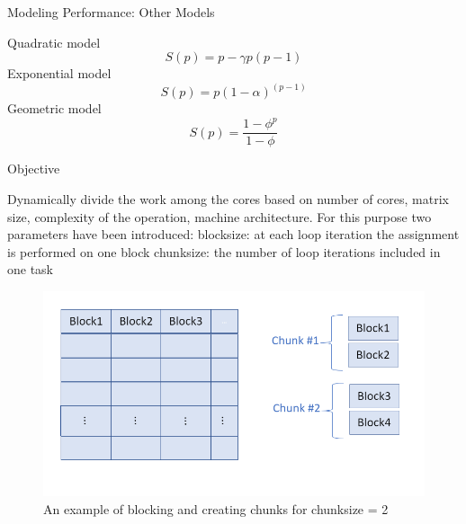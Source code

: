 \documentclass[10pt]{beamer}
\begin{document}
\begin{frame}{Modeling Performance: Other Models}
	\begin{outline}
		\1Quadratic model
		$$ S(p) = p-\gamma{p(p-1)}$$
		\1Exponential model
		$$S(p) = p(1-\alpha)^{(p-1)}$$
		\1Geometric model
		$$S(p) = \frac{1-\phi^{p}}{1-\phi}$$
	\end{outline}
\end{frame}

\begin{frame}{Objective}
	\begin{outline}
		Dynamically divide the work among the cores based on number of cores, matrix size, complexity of the operation, machine architecture.
		For this purpose two parameters have been introduced:
		\1block\textunderscore size: at each loop iteration the assignment is performed on one block
		\1chunk\textunderscore size: the number of loop iterations included in one task 
		\begin{figure}
			\centering
			\includegraphics[width=0.72\linewidth]{images/chunks.png}
			\caption{An example of blocking and creating chunks for chunk\textunderscore size = 2}	
		\end{figure}	
	\end{outline}
\end{frame}

\end{document}

